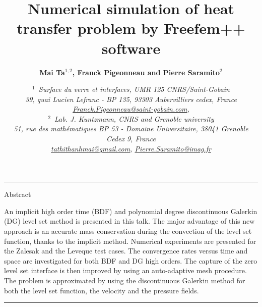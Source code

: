 \documentclass[notitlepage,a4paper,fleqn,9pt]{icmfarticle}
\title{\bf 
  Numerical simulation of heat transfer problem by Freefem++ software
}
\author{\normalsize\bf
Mai Ta$^{1,2}$, Franck Pigeonneau and Pierre Saramito$^2$
}
\date{\normalsize\vspace{-2ex}\em
$^1$~Surface du verre et interfaces, UMR 125 CNRS/Saint-Gobain\\
39, quai Lucien Lefranc - BP 135, 93303 Aubervilliers cedex, France\\
\href{mailto:Franck.Pigeonneau@saint-gobain.com}{Franck.Pigeonneau@saint-gobain.com},\\[1.1mm]
%
$^2$~Lab. J. Kuntzmann, CNRS and Grenoble university\\
51, rue des math\'ematiques BP 53 - Domaine Universitaire, 38041 Grenoble Cedex 9, France \\
\href{mailto:tathithanhmai@gmail.com}{tathithanhmai@gmail.com},
\href{mailto:Pierre.Saramito@imag.fr}{Pierre.Saramito@imag.fr}
}
\begin{document}
\raggedcolumns

\maketitle
\vspace{-3mm}
\noindent\rule{\textwidth}{.1pt}

\noindent
Abstract\\
\vspace{1ex}

\noindent
An implicit high order time (BDF) and polynomial degree discontinuous Galerkin (DG) level set method is presented in this talk. The major advantage of this new approach is an accurate mass conservation during the convection of the level set function, thanks to the implicit method. Numerical experiments are presented for the Zalesak and the Leveque test cases. The convergence rates versus time and space are investigated for both BDF and DG high orders. The capture of the zero level set interface is then improved by using an auto-adaptive mesh procedure. 
The problem is approximated by using the discontinuous Galerkin method for both the level set function, the velocity and the pressure fields.
\\
\vspace{1ex}


\noindent\rule{\textwidth}{.1pt}\vspace{2mm}
\end{document}
